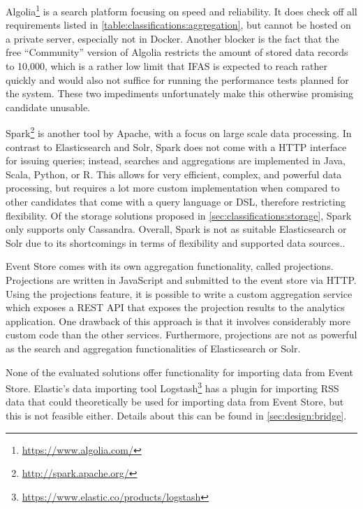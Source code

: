Algolia\footnote{\url{https://www.algolia.com/}} is a search platform focusing on speed and reliability.
It does check off all requirements listed in \cref{table:classifications:aggregation}, but cannot be hosted on a private server, especially not in Docker.
Another blocker is the fact that the free ``Community'' version of Algolia restricts the amount of stored data records to 10,000, which is a rather low limit that \ac{IFAS} is expected to reach rather quickly and would also not suffice for running the performance tests planned for the system.
These two impediments unfortunately make this otherwise promising candidate unusable.

Spark\footnote{\url{http://spark.apache.org/}} is another tool by Apache, with a focus on large scale data processing.
In contrast to Elasticsearch and Solr, Spark does not come with a HTTP interface for issuing queries; instead, searches and aggregations are implemented in Java, Scala, Python, or R.
This allows for very efficient, complex, and powerful data processing, but requires a lot more custom implementation when compared to other candidates that come with a query language or \ac{DSL}, therefore restricting flexibility.
Of the storage solutions proposed in \cref{sec:classifications:storage}, Spark only supports only Cassandra.
Overall, Spark is not as suitable Elasticsearch or Solr due to its shortcomings in terms of flexibility and supported data sources..

Event Store comes with its own aggregation functionality, called projections.
Projections are written in JavaScript and submitted to the event store via HTTP.
Using the projections feature, it is possible to write a custom aggregation service which exposes a \ac{REST} API that exposes the projection results to the analytics application.
One drawback of this approach is that it involves considerably more custom code than the other services.
Furthermore, projections are not as powerful as the search and aggregation functionalities of Elasticsearch or Solr.

None of the evaluated solutions offer functionality for importing data from Event Store.
Elastic's data importing tool Logstash\footnote{\url{https://www.elastic.co/products/logstash}} has a plugin for importing \ac{RSS} data that could theoretically be used for importing data from Event Store, but this is not feasible either.
Details about this can be found in \cref{sec:design:bridge}.

